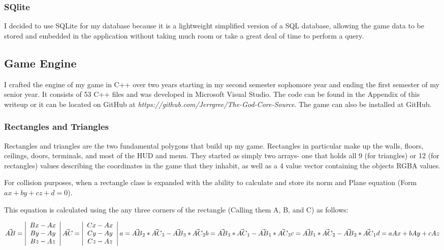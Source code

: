 \documentclass{article}
\begin{document}
\subsubsection{SQlite}
I decided to use SQLite for my database because it is a lightweight simplified version of a SQL database, allowing the game data to be stored and embedded in the application without taking much room or take a great deal of time to perform a query.

\subsection{Game Engine}

I crafted the engine of my game in C++ over two years starting in my second semester sophomore year and ending the first semester of my senior year. It consists of 53 C++ files and was developed in Microsoft Visual Studio. The code can be found in the Appendix of this writeup or it can be located on GitHub at \emph{https://github.com/Jerrgree/The-God-Core-Source}. The game can also be installed at GitHub.

\subsubsection{Rectangles and Triangles}
Rectangles and triangles are the two fundamental polygons that build up my game. Rectangles in particular make up the walls, floors, ceilings, doors, terminals, and most of the HUD and menu. They started as simply two arrays- one that holds all 9 (for triangles) or 12 (for rectangles) values describing the coordinates in the game that they inhabit, as well as a 4 value vector containing the objects RGBA values.

For collision purposes, when a rectangle class is expanded with the ability to calculate and store its norm and Plane equation (Form $ax + by + cz + d = 0$).

This equation is calculated using the any three corners of the rectangle (Calling them A, B, and C) as follows:

\noindent
$
\vec{AB} = \left| \begin{array}{c}
Bx - Ax \\
By - Ay \\
Bz - Az
\end{array} \right|
\vec{AC} = \left| \begin{array}{c}
Cx - Ax \\
Cy - Ay \\
Cz - Az
\end{array} \right| \\
a = \vec{AB}_2 * \vec{AC}_3 - \vec{AB}_3 * \vec{AC}_2 \\
b = \vec{AB}_3 * \vec{AC}_1 - \vec{AB}_1 * \vec{AC}_3 \\
c = \vec{AB}_1 * \vec{AC}_2 - \vec{AB}_2 * \vec{AC}_1 \\
d = aAx + bAy + cAz
$
\end{document}
